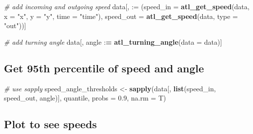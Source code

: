 \documentclass[
]{scrreprt}
\newenvironment{Shaded}{}{}
\newcommand{\CommentTok}[1]{\textcolor[rgb]{0.38,0.63,0.69}{\textit{#1}}}
\newcommand{\DataTypeTok}[1]{\textcolor[rgb]{0.56,0.13,0.00}{#1}}
\newcommand{\ErrorTok}[1]{\textcolor[rgb]{1.00,0.00,0.00}{\textbf{#1}}}
\newcommand{\FloatTok}[1]{\textcolor[rgb]{0.25,0.63,0.44}{#1}}
\newcommand{\KeywordTok}[1]{\textcolor[rgb]{0.00,0.44,0.13}{\textbf{#1}}}
\newcommand{\NormalTok}[1]{#1}
\newcommand{\OperatorTok}[1]{\textcolor[rgb]{0.40,0.40,0.40}{#1}}
\newcommand{\StringTok}[1]{\textcolor[rgb]{0.25,0.44,0.63}{#1}}
\begin{document}
\begin{Shaded}
\begin{Highlighting}[]
\CommentTok{\# add incoming and outgoing speed}
\NormalTok{data[, }\StringTok{\textasciigrave{}}\DataTypeTok{:=}\StringTok{\textasciigrave{}}\NormalTok{ (}\DataTypeTok{speed\_in =} \KeywordTok{atl\_get\_speed}\NormalTok{(data, }
                                      \DataTypeTok{x =} \StringTok{"x"}\NormalTok{, }
                                      \DataTypeTok{y =} \StringTok{"y"}\NormalTok{, }
                                      \DataTypeTok{time =} \StringTok{"time"}\NormalTok{),}
             \DataTypeTok{speed\_out =} \KeywordTok{atl\_get\_speed}\NormalTok{(data, }\DataTypeTok{type =} \StringTok{"out"}\NormalTok{))]}

\CommentTok{\# add turning angle}
\NormalTok{data[, angle }\OperatorTok{:}\ErrorTok{=}\StringTok{ }\KeywordTok{atl\_turning\_angle}\NormalTok{(}\DataTypeTok{data =}\NormalTok{ data)]}
\end{Highlighting}
\end{Shaded}

\hypertarget{get-95th-percentile-of-speed-and-angle}{%
\subsection{Get 95th percentile of speed and angle}\label{get-95th-percentile-of-speed-and-angle}}

\begin{Shaded}
\begin{Highlighting}[]
\CommentTok{\# use sapply}
\NormalTok{speed\_angle\_thresholds <{-}}\StringTok{ }
\StringTok{  }\KeywordTok{sapply}\NormalTok{(data[, }\KeywordTok{list}\NormalTok{(speed\_in, speed\_out, angle)], }
\NormalTok{       quantile, }\DataTypeTok{probs =} \FloatTok{0.9}\NormalTok{, }\DataTypeTok{na.rm =}\NormalTok{ T)}
\end{Highlighting}
\end{Shaded}

\hypertarget{plot-to-see-speeds}{%
\subsection{Plot to see speeds}\label{plot-to-see-speeds}}
\end{document}
